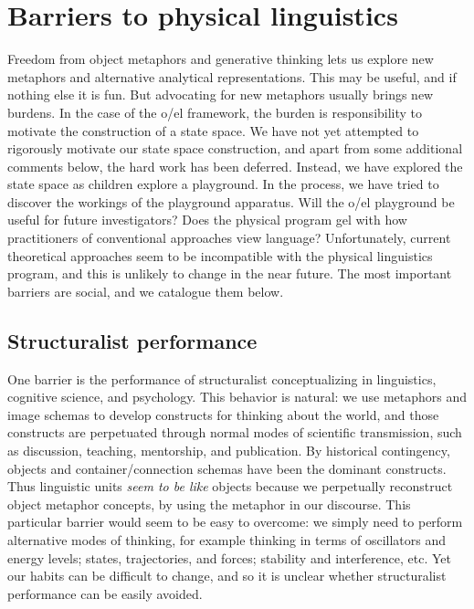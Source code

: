 \section{Barriers to physical linguistics}

Freedom from object metaphors and generative thinking lets us explore new metaphors and alternative analytical representations. This may be useful, and if nothing else it is fun. But advocating for new metaphors usually brings new burdens. In the case of the o/el framework, the burden is responsibility to motivate the construction of a state space. We have not yet attempted to rigorously motivate our state space construction, and apart from some additional comments below, the hard work has been deferred. Instead, we have explored the state space as children explore a playground. In the process, we have tried to discover the workings of the playground apparatus. Will the o/el playground be useful for future investigators? Does the physical program gel with how practitioners of conventional approaches view language? Unfortunately, current theoretical approaches seem to be incompatible with the physical linguistics program, and this is unlikely to change in the near future. The most important barriers are social, and we catalogue them below.

\subsection{Structuralist performance}

One barrier is the performance of structuralist conceptualizing in linguistics, cognitive science, and psychology. This behavior is natural: we use metaphors and image schemas to develop constructs for thinking about the world, and those constructs are perpetuated through normal modes of scientific transmission, such as discussion, teaching, mentorship, and publication. By historical contingency, objects and container/connection schemas have been the dominant constructs. Thus linguistic units \textit{seem to be like} objects because we perpetually reconstruct object metaphor concepts, by using the metaphor in our discourse. This particular barrier would seem to be easy to overcome: we simply need to perform alternative modes of thinking, for example thinking in terms of oscillators and energy levels; states, trajectories, and forces; stability and interference, etc. Yet our habits can be difficult to change, and so it is unclear whether structuralist performance can be easily avoided.

